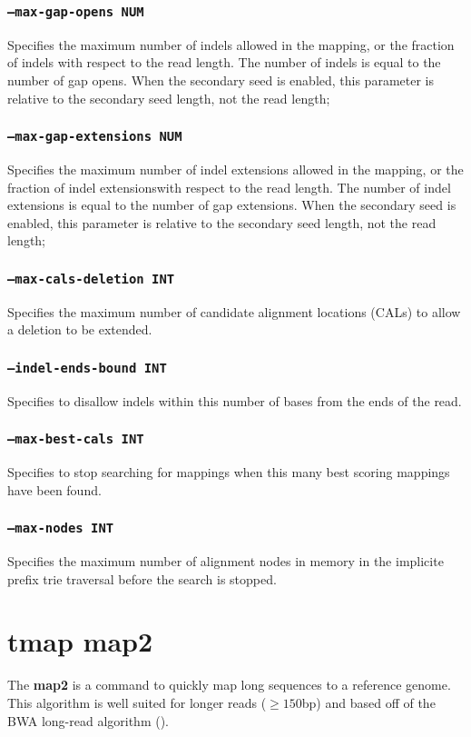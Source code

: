 \documentclass[a4paper,12pt]{book}
\newcommand{\TT}[1]{{\tt #1}} %
\newcommand{\BF}[1]{{\bf #1}} %
\begin{document}
\subsubsection{\TT{--max-gap-opens NUM}}
Specifies the maximum number of indels allowed in the mapping, or the fraction of indels with respect to the read length.
The number of indels is equal to the number of gap opens.
When the secondary seed is enabled, this parameter is relative to the secondary seed length, not the read length;

\subsubsection{\TT{--max-gap-extensions NUM}}
Specifies the maximum number of indel extensions allowed in the mapping, or the fraction of indel extensionswith respect to the read length.
The number of indel extensions is equal to the number of gap extensions.
When the secondary seed is enabled, this parameter is relative to the secondary seed length, not the read length;

\subsubsection{\TT{--max-cals-deletion INT}}
Specifies the maximum number of candidate alignment locations (CALs) to allow a deletion to be extended.

\subsubsection{\TT{--indel-ends-bound INT}}
Specifies to disallow indels within this number of bases from the ends of the read.

\subsubsection{\TT{--max-best-cals INT}}
Specifies to stop searching for mappings when this many best scoring mappings have been found.

\subsubsection{\TT{--max-nodes INT}}
Specifies the maximum number of alignment nodes in memory in the implicite prefix trie traversal before the search is stopped.

\section{tmap map2}
\label{sec:map2}
The \BF{map2} is a command to quickly map long sequences to a reference genome.
This algorithm is well suited for longer reads ($\geq 150$bp) and based off of the BWA long-read algorithm (\cite{BWA-long}).
\end{document}
